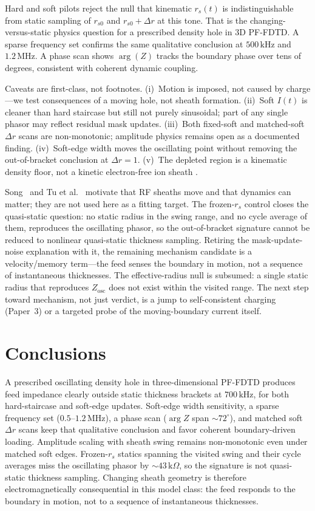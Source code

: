 \documentclass[draft]{agujournal2025}
\begin{document}
Hard and soft pilots reject the null that kinematic \(r_s(t)\) is indistinguishable from static sampling of \(r_{s0}\) and \(r_{s0}+\Delta r\) at this tone.
That is the changing-versus-static physics question for a prescribed density hole in 3D PF-FDTD.
A sparse frequency set confirms the same qualitative conclusion at \(500\,\mathrm{kHz}\) and \(1.2\,\mathrm{MHz}\).
A phase scan shows \(\arg(Z)\) tracks the boundary phase over tens of degrees, consistent with coherent dynamic coupling.

Caveats are first-class, not footnotes.
(i)~Motion is imposed, not caused by charge---we test consequences of a moving hole, not sheath formation.
(ii)~Soft \(I(t)\) is cleaner than hard staircase but still not purely sinusoidal; part of any single phasor may reflect residual mask updates.
(iii)~Both fixed-soft and matched-soft \(\Delta r\) scans are non-monotonic; amplitude physics remains open as a documented finding.
(iv)~Soft-edge width moves the oscillating point without removing the out-of-bracket conclusion at \(\Delta r=1\).
(v)~The depleted region is a kinematic density floor, not a kinetic electron-free ion sheath
\cite{song2007,tu2008}.

Song~\cite{song2007} and Tu et al.~\cite{tu2008} motivate that RF sheaths move and that dynamics can matter; they are not used here as a fitting target.
The frozen-\(r_s\) control closes the quasi-static question: no static radius in the swing range, and no cycle average of them, reproduces the oscillating phasor, so the out-of-bracket signature cannot be reduced to nonlinear quasi-static thickness sampling.
Retiring the mask-update-noise explanation with it, the remaining mechanism candidate is a velocity/memory term---the feed senses the boundary in motion, not a sequence of instantaneous thicknesses.
The effective-radius null is subsumed: a single static radius that reproduces \(Z_\mathrm{osc}\) does not exist within the visited range.
The next step toward mechanism, not just verdict, is a jump to self-consistent charging (Paper~3) or a targeted probe of the moving-boundary current itself.

\section{Conclusions}
\label{sec:conclusions}

A prescribed oscillating density hole in three-dimensional PF-FDTD produces feed impedance clearly outside static thickness brackets at \(700\,\mathrm{kHz}\), for both hard-staircase and soft-edge updates.
Soft-edge width sensitivity, a sparse frequency set (\(0.5\)--\(1.2\,\mathrm{MHz}\)), a phase scan (\(\arg Z\) span \(\sim 72^\circ\)), and matched soft \(\Delta r\) scans keep that qualitative conclusion and favor coherent boundary-driven loading.
Amplitude scaling with sheath swing remains non-monotonic even under matched soft edges.
Frozen-$r_s$ statics spanning the visited swing and their cycle averages miss the oscillating phasor by $\sim 43\,\mathrm{k}\Omega$, so the signature is not quasi-static thickness sampling.
Changing sheath geometry is therefore electromagnetically consequential in this model class: the feed responds to the boundary in motion, not to a sequence of instantaneous thicknesses.
\end{document}
